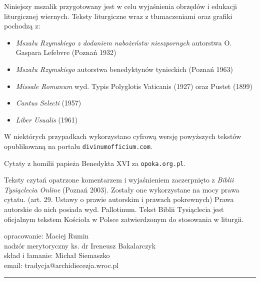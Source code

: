 \documentclass[10pt,a5paper]{mszalik}
\begin{document}
{\footnotesize Niniejszy mszalik przygotowany jest w celu wyjaśnienia obrzędów i
	edukacji liturgicznej wiernych. Teksty liturgiczne wraz z tłumaczeniami oraz
	grafiki pochodzą z:

	\begin{itemize}[leftmargin=*]
		\item \textit{Mszału Rzymskiego z dodaniem nabożeństw nieszpornych}
		      autorstwa O. Gaspara Lefebvre (Poznań 1932)
		\item \textit{Mszału Rzymskiego} autorstwa benedyktynów tynieckich
		      (Poznań 1963)
		\item \textit{Missale Romanum} wyd. Typis Polyglotis Vaticanis (1927)
		      oraz Pustet (1899)
		\item \textit{Cantus Selecti} (1957)
		\item \textit{Liber Usualis} (1961)
	\end{itemize}

	W niektórych przypadkach wykorzystano cyfrową wersję powyższych tekstów
	opublikowaną na portalu \texttt{divinumofficium.com}.

	\medskip

	Cytaty z homilii papieża Benedykta XVI za \texttt{opoka.org.pl}.

	\medskip

	Teksty czytań opatrzone komentarzem i wyjaśnieniem zaczerpnięto z
	\textit{Biblii Tysiąclecia Online} (Poznań 2003). Zostały one wykorzystane
	na mocy prawa cytatu. (art. 29. Ustawy o prawie autorskim i prawach
	pokrewnych) Prawa autorskie do nich posiada wyd. Pallotinum. Tekst Biblii
	Tysiąclecia jest oficjalnym tekstem Kościoła w Polsce zatwierdzonym do
	stosowania w liturgii.

	\bigskip

	opracowanie: Maciej Rumin\\
	nadzór merytoryczny ks. dr Ireneusz Bakalarczyk\\
	skład i łamanie: Michał Siemaszko\\

	email: tradycja@archidiecezja.wroc.pl
}
\hrule

\newpage


\newpage

\end{document}
